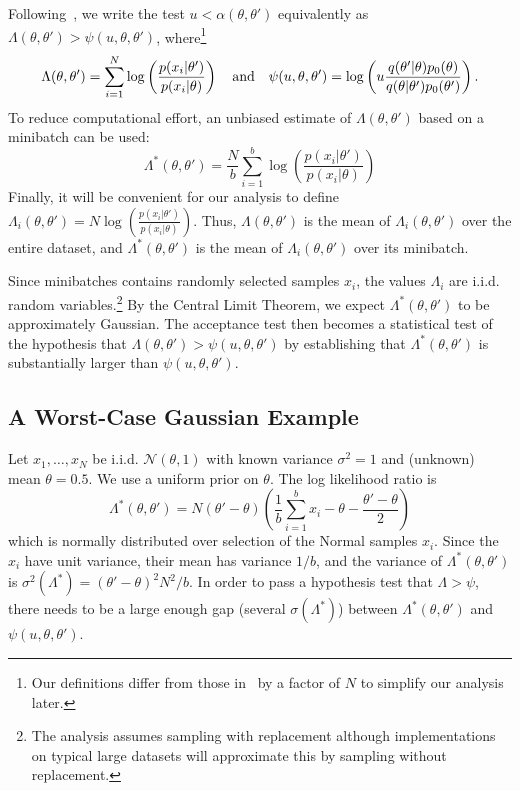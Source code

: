 \documentclass{article}
\begin{document}
Following~\cite{icml2014c1_bardenet14}, we write the test
$u<\alpha(\theta,\theta')$ equivalently as $\Lambda(\theta,\theta') >
\psi(u,\theta,\theta')$, where\footnote{Our definitions differ from those
in~\cite{icml2014c1_bardenet14} by a factor of $N$ to simplify our analysis
later.}
\begin{equation}
\Lambda(\theta,\theta') = \sum_{i=1}^N \log\left(\frac{p(x_i|\theta')}{p(x_i|\theta)}\right)
\quad {\rm and} \quad 
\psi(u,\theta,\theta') = \log\left(u\frac{q(\theta'|\theta)p_0(\theta)}{q(\theta|\theta')p_0(\theta')}\right).
\end{equation}
To reduce computational effort, an unbiased estimate of $\Lambda(\theta,\theta')$
based on a minibatch can be used:
\begin{equation}
\Lambda^*(\theta,\theta') = \frac{N}{b}\sum_{i=1}^b \log\left(\frac{p(x_i|\theta')}{p(x_i|\theta)}\right)  
\end{equation}
Finally, it will be convenient for our analysis to define
$\Lambda_i(\theta,\theta') = N\log(\frac{p(x_i|\theta')}{p(x_i|\theta)})$.
Thus, $\Lambda(\theta,\theta')$ is the mean of $\Lambda_i(\theta,\theta')$ over
the entire dataset, and $\Lambda^*(\theta,\theta')$ is the mean of
$\Lambda_i(\theta,\theta')$ over its minibatch. 

Since minibatches contains randomly selected samples $x_i$, the values
$\Lambda_i$ are i.i.d. random variables.\footnote{The analysis assumes sampling
with replacement although implementations on typical large datasets will
approximate this by sampling without replacement.} By the Central Limit
Theorem, we expect $\Lambda^*(\theta,\theta')$ to be approximately Gaussian. The
acceptance test then becomes a statistical test of the hypothesis that
$\Lambda(\theta,\theta')>\psi(u,\theta,\theta')$ by establishing that
$\Lambda^*(\theta,\theta')$ is substantially larger than
$\psi(u,\theta,\theta')$.


\subsection{A Worst-Case Gaussian Example}\label{ssec:gaussian_example}

Let $x_1,\ldots,x_N$ be i.i.d. $\mathcal{N}(\theta,1)$ with known variance
$\sigma^2=1$ and (unknown) mean $\theta=0.5$. We use a uniform prior on
$\theta$. The log likelihood ratio is
\begin{equation}\label{eq:lemma_ll_ratio}
    \Lambda^*(\theta,\theta') = N(\theta'-\theta)\left(\frac{1}{b}\sum_{i=1}^b x_i-\theta-\frac{\theta'-\theta}{2}\right)
\end{equation}
which is normally distributed over selection of the Normal samples $x_i$.  Since
the $x_i$ have unit variance, their mean has variance $1/b$, and the variance of
$\Lambda^*(\theta,\theta')$ is $\sigma^2(\Lambda^*) = (\theta'-\theta)^2N^2/b$.
In order to pass a hypothesis test that $\Lambda > \psi$, there needs to be a
large enough gap (several $\sigma(\Lambda^*)$) between
$\Lambda^*(\theta,\theta')$ and $\psi(u,\theta,\theta')$. 
\end{document}
